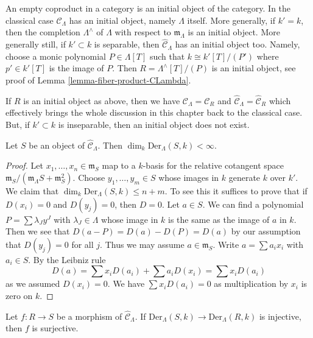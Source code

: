 \noindent
An empty coproduct in a category is an initial object of the category.
In the classical case $\widehat{\mathcal{C}}_\Lambda$ has an initial
object, namely $\Lambda$ itself. More generally, if $k' = k$, then
the completion $\Lambda^\wedge$ of $\Lambda$ with respect to
$\mathfrak m_\Lambda$ is an initial object. More generally still, if
$k' \subset k$ is separable, then $\widehat{\mathcal{C}}_\Lambda$ has an
initial object too. Namely, choose a monic polynomial $P \in \Lambda[T]$
such that $k \cong k'[T]/(P')$ where $p' \in k'[T]$ is the image
of $P$. Then $R = \Lambda^\wedge[T]/(P)$ is an initial object, see proof of
Lemma \ref{lemma-fiber-product-CLambda}.

\medskip\noindent
If $R$ is an initial object as above, then we have
$\mathcal{C}_\Lambda = \mathcal{C}_R$ and
$\widehat{\mathcal{C}}_\Lambda = \widehat{\mathcal{C}}_R$ which effectively
brings the whole discussion in this chapter back to the classical case.
But, if $k' \subset k$ is inseparable, then an initial object does not
exist.

\begin{lemma}
\label{lemma-derivations-finite}
Let $S$ be an object of $\widehat{\mathcal{C}}_\Lambda$.
Then $\dim_k \text{Der}_\Lambda(S, k) < \infty$.
\end{lemma}

\begin{proof}
Let $x_1, \ldots, x_n \in \mathfrak m_S$ map to a $k$-basis
for the relative cotangent space
$\mathfrak m_S/(\mathfrak m_\Lambda S + \mathfrak m_S^2)$.
Choose $y_1, \ldots, y_m \in S$ whose images in $k$ generate $k$
over $k'$. We claim that $\dim_k \text{Der}_\Lambda(S, k) \leq n + m$.
To see this it suffices to prove that if $D(x_i) = 0$ and
$D(y_j) = 0$, then $D = 0$. Let $a \in S$. We can find a
polynomial $P = \sum \lambda_J y^J$ with $\lambda_J \in \Lambda$
whose image in $k$ is the same as the image of $a$ in $k$.
Then we see that $D(a - P) = D(a) - D(P) = D(a)$ by our assumption
that $D(y_j) = 0$ for all $j$. Thus we may assume $a \in \mathfrak m_S$.
Write $a = \sum a_i x_i$ with $a_i \in S$. By the Leibniz rule
$$
D(a) = \sum x_iD(a_i) + \sum a_iD(x_i) = \sum x_iD(a_i)
$$
as we assumed $D(x_i) = 0$. We have $\sum x_iD(a_i) = 0$
as multiplication by $x_i$ is zero on $k$.
\end{proof}

\begin{lemma}
\label{lemma-derivations-surjective}
Let $f : R \to S$ be a morphism of $\widehat{\mathcal{C}}_\Lambda$.
If $\text{Der}_\Lambda(S, k) \to \text{Der}_\Lambda(R, k)$ is injective,
then $f$ is surjective.
\end{lemma}

